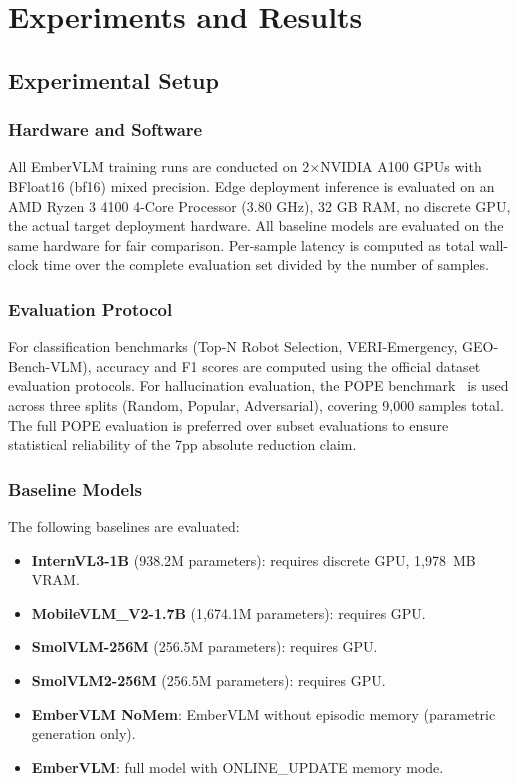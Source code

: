 \chapter{Experiments and Results}
\label{cha:experiments}

\section{Experimental Setup}
\label{sec:exp_setup}

\subsection{Hardware and Software}
All EmberVLM training runs are conducted on 2$\times$NVIDIA A100 GPUs with BFloat16 (bf16) mixed precision. Edge deployment inference is evaluated on an AMD Ryzen 3 4100 4-Core Processor (3.80 GHz), 32 GB RAM, no discrete GPU, the actual target deployment hardware. All baseline models are evaluated on the same hardware for fair comparison. Per-sample latency is computed as total wall-clock time over the complete evaluation set divided by the number of samples.

\subsection{Evaluation Protocol}
For classification benchmarks (Top-N Robot Selection, VERI-Emergency, GEO-Bench-VLM), accuracy and F1 scores are computed using the official dataset evaluation protocols. For hallucination evaluation, the POPE benchmark~\cite{li2023pope} is used across three splits (Random, Popular, Adversarial), covering 9{,}000 samples total. The full POPE evaluation is preferred over subset evaluations to ensure statistical reliability of the 7pp absolute reduction claim.

\subsection{Baseline Models}
The following baselines are evaluated:
\begin{itemize}
    \item \textbf{InternVL3-1B} (938.2M parameters): requires discrete GPU, 1{,}978~MB VRAM.
    \item \textbf{MobileVLM\_V2-1.7B} (1{,}674.1M parameters): requires GPU.
    \item \textbf{SmolVLM-256M} (256.5M parameters): requires GPU.
    \item \textbf{SmolVLM2-256M} (256.5M parameters): requires GPU.
    \item \textbf{EmberVLM NoMem}: EmberVLM without episodic memory (parametric generation only).
    \item \textbf{EmberVLM}: full model with ONLINE\_UPDATE memory mode.
\end{itemize}

